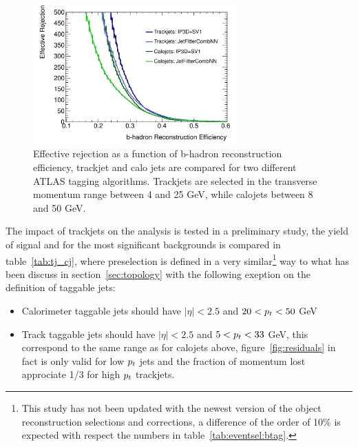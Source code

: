 \begin{figure}[tp]
\centering
\includegraphics[width=0.7\textwidth]{figure/trackjet/eff_real_rej_mod.pdf}
\caption{Effective rejection as a function of b-hadron reconstruction efficiency, trackjet and calo jets are
	compared for two different ATLAS tagging algorithms. Trackjets are selected in the transverse momentum range 
	between 4 and 25 GeV, while calojets between 8 and 50 GeV.}
\label{fig:cj_tj}
\end{figure}    

The impact of trackjets on the analysis is tested in a preliminary study, the yield of 
signal and for the most significant backgrounds is compared in table~\ref{tab:tj_cj},
where preselection is defined in a very similar\footnote{This study has not been updated 
with the newest version of the object reconstruction selections and corrections, a difference of the order of 10\%
is expected with respect the numbers in table~\ref{tab:eventsel:btag}.} 
way to what has been discuss in section~\ref{sec:topology} with the following exeption 
on the definition of taggable jets:
\begin{itemize}
\item Calorimeter taggable jets should have $|\eta| < 2.5$ and $20 < p_{t} < 50$ GeV
\item Track taggable jets should have $|\eta| < 2.5$ and $5 < p_{t} < 33$ GeV, this correspond to the same
  	range as for calojets above, figure~\ref{fig:residuals} in fact is only valid for low $p_{t}$ jets
	and the fraction of momentum lost approciate 1/3 for high $p_{t}$ trackjets. 
\end{itemize} 

